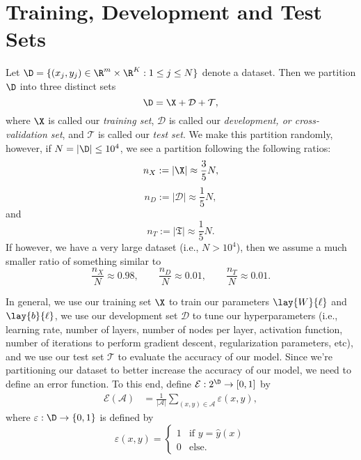 

\section{Training, Development and Test Sets}

Let $\D=\{(x_j,y_j)\in\R^m\times\R^K:1\leq j\leq N\}$ denote a dataset.  Then we partition $\D$ into three distinct sets
$$\D=\X+\mathcal{D}+\mathcal{T},$$
where $\X$ is called our \textit{training set}, $\mathcal{D}$ is called our \textit{development, or cross-validation set}, and $\mathcal{T}$ is called our \textit{test set}. We make this partition randomly, however, if $N=|\D|\leq 10^4$, we see a partition following the following ratios:
$$n_X:=|\X|\approx \frac{3}{5}N,$$
$$n_D:=|\mathcal{D}|\approx\frac{1}{5}N,$$
and
$$n_T:=|\mathfrak{T}|\approx\frac{1}{5}N.$$
If however, we have a very large dataset (i.e., $N>10^4$), then we assume a much smaller ratio of something similar to
$$\frac{n_X}{N}\approx0.98,\qquad\frac{n_D}{N}\approx 0.01,\qquad\frac{n_T}{N}\approx 0.01.$$

In general, we use our training set $\X$ to train our parameters $\lay{W}{\ell}$ and $\lay{b}{\ell}$, we use our development set $\mathcal{D}$ to tune our hyperparameters (i.e., learning rate, number of layers, number of nodes per layer, activation function, number of iterations to perform gradient descent, regularization parameters, etc), and we use our test set $\mathcal{T}$ to evaluate the accuracy of our model.  Since we're partitioning our dataset to better increase the accuracy of our model, we need to define an error function.  To this end, define $\mathcal{E}:2^\D\to[0,1]$ by
\begin{align*}
	\mathcal{E}(\mathcal{A})&=\frac{1}{|\mathcal{A}|}\sum_{(x,y)\in\mathcal{A}}\varepsilon(x,y),
\end{align*}
where $\varepsilon:\D\to\{0,1\}$ is defined by
$$\varepsilon(x,y)=\begin{cases}
	1&\text{if }y = \hat{y}(x)\\
	0&\text{else.}
\end{cases}$$

